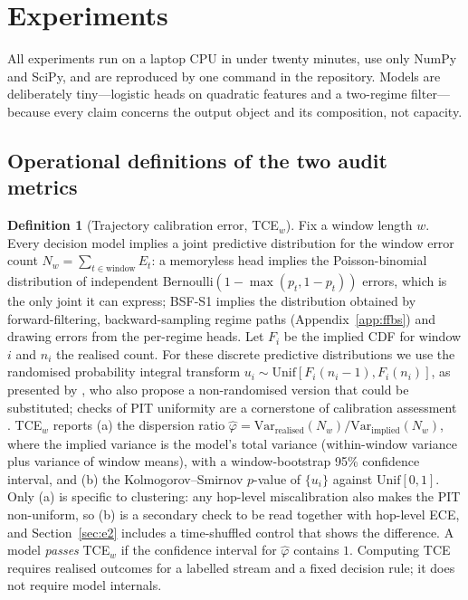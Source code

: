 \documentclass[11pt,a4paper]{article}
\numberwithin{equation}{section}
\theoremstyle{plain}
\theoremstyle{definition}
\newtheorem{definition}{Definition}
\theoremstyle{remark}
\newcommand{\Var}{\mathrm{Var}}
\begin{document}
\section{Experiments}\label{sec:experiments}

All experiments run on a laptop CPU in under twenty minutes, use only NumPy and SciPy, and are reproduced by one command in the repository. Models are deliberately tiny---logistic heads on quadratic features and a two-regime filter---because every claim concerns the output object and its composition, not capacity.

\subsection{Operational definitions of the two audit metrics}

\begin{definition}[Trajectory calibration error, TCE$_w$]
Fix a window length $w$. Every decision model implies a joint predictive distribution for the window error count $N_w=\sum_{t\in\text{window}}E_t$: a memoryless head implies the Poisson-binomial distribution of independent Bernoulli$(1-\max(p_t,1-p_t))$ errors, which is the only joint it can express; BSF-S1 implies the distribution obtained by forward-filtering, backward-sampling regime paths (Appendix~\ref{app:ffbs}) and drawing errors from the per-regime heads. Let $F_i$ be the implied CDF for window $i$ and $n_i$ the realised count. For these discrete predictive distributions we use the randomised probability integral transform $u_i\sim\mathrm{Unif}[F_i(n_i-1),F_i(n_i)]$, as presented by \citet{czado2009}, who also propose a non-randomised version that could be substituted; checks of PIT uniformity are a cornerstone of calibration assessment \citep{gneiting2007sharp}. TCE$_w$ reports (a) the dispersion ratio $\hat\varphi=\Var_{\text{realised}}(N_w)/\Var_{\text{implied}}(N_w)$, where the implied variance is the model's total variance (within-window variance plus variance of window means), with a window-bootstrap 95\% confidence interval, and (b) the Kolmogorov--Smirnov $p$-value of $\{u_i\}$ against $\mathrm{Unif}[0,1]$. Only (a) is specific to clustering: any hop-level miscalibration also makes the PIT non-uniform, so (b) is a secondary check to be read together with hop-level ECE, and Section~\ref{sec:e2} includes a time-shuffled control that shows the difference. A model \emph{passes} TCE$_w$ if the confidence interval for $\hat\varphi$ contains $1$. Computing TCE requires realised outcomes for a labelled stream and a fixed decision rule; it does not require model internals.
\end{definition}
\end{document}
